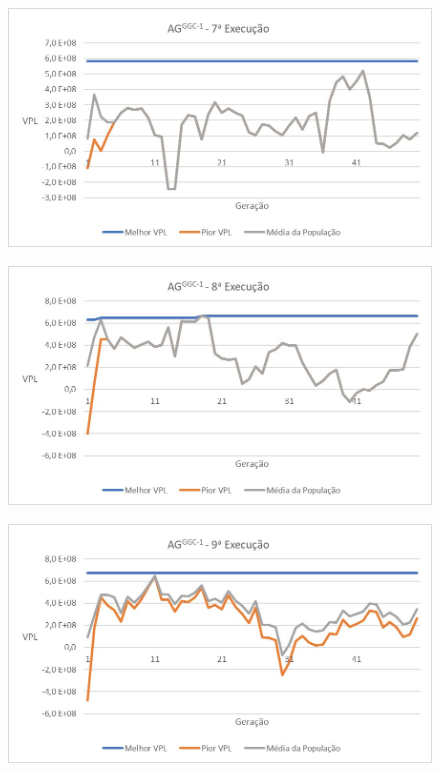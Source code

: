 \documentclass[12pt,a4paper]{report}
\begin{document}
\begin{figure}[H]
\centering

\includegraphics[scale=1]{ApA/GCC/7}
\end{figure}

\begin{figure}[H]
\centering

\includegraphics[scale=1]{ApA/GCC/8}
\end{figure}

\begin{figure}[H]
\centering

\includegraphics[scale=1]{ApA/GCC/9}
\end{figure}
\end{document}
